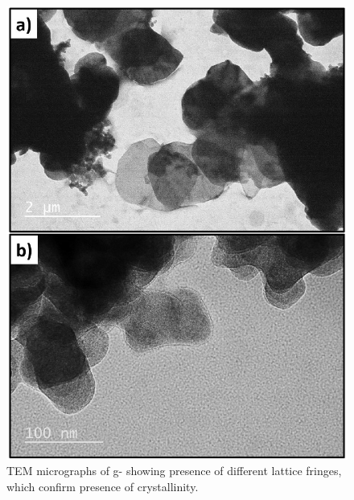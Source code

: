 \begin{figure}[tbh!]
\centering
\includegraphics[width=\textwidth]{Figures/appendix/cntem.pdf}
\caption{TEM micrographs of g- showing presence of different lattice fringes, which confirm presence of crystallinity.}
\label{Figures/appendix:cntem}
\end{figure}